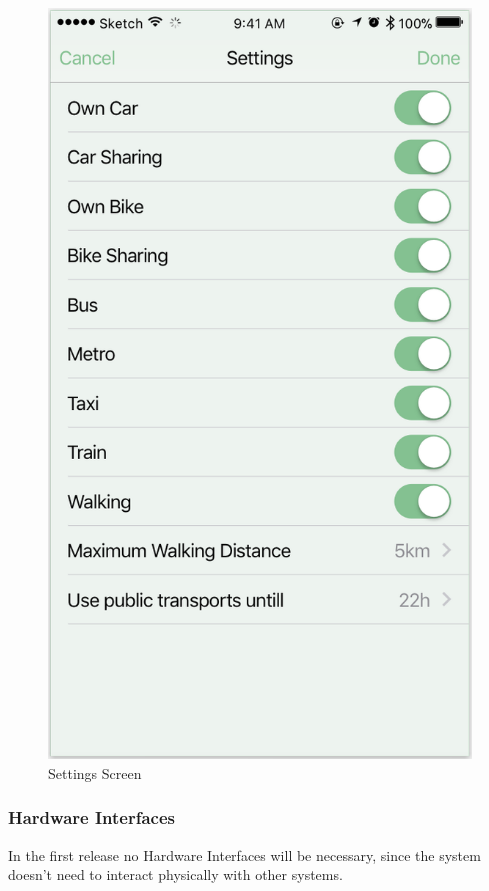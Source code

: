 \documentclass[12pt]{article}
\begin{document}
\begin{figure}[H]
\centering
    \includegraphics[scale=0.45]{interfaceSettings.png}
    \caption{Settings Screen}
\label{fig:settingsScreen}
\end{figure}


\subsubsection{Hardware Interfaces}
In the first release no Hardware Interfaces will be necessary, since the system doesn't need to interact physically with other systems.
\end{document}

